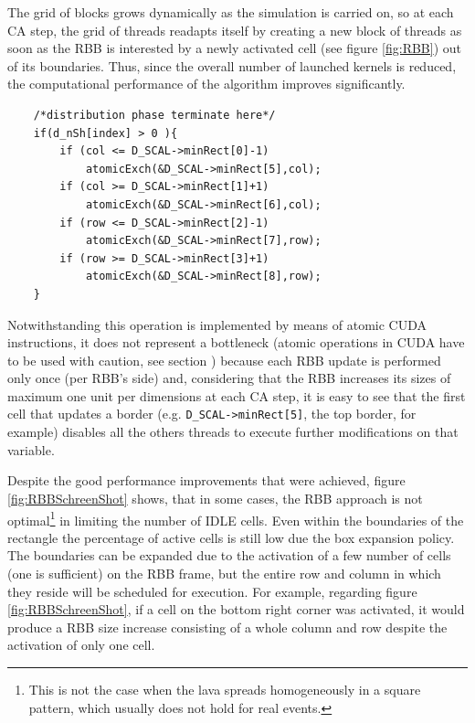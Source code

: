 The grid of blocks grows dynamically as the simulation is carried on, so at each
CA step, the grid of threads readapts itself by creating a new block of threads as
soon as the RBB is interested by a newly activated cell (see figure
\ref{fig:RBB}) out of its boundaries.
Thus, since the overall number of launched kernels is reduced,
the computational performance of the algorithm improves significantly.


\begin{lstlisting}
	/*distribution phase terminate here*/
	if(d_nSh[index] > 0 ){	
		if (col <= D_SCAL->minRect[0]-1)
			atomicExch(&D_SCAL->minRect[5],col);
		if (col >= D_SCAL->minRect[1]+1)
			atomicExch(&D_SCAL->minRect[6],col);
		if (row <= D_SCAL->minRect[2]-1)
			atomicExch(&D_SCAL->minRect[7],row);
		if (row >= D_SCAL->minRect[3]+1)
			atomicExch(&D_SCAL->minRect[8],row);
	}
\end{lstlisting}

Notwithstanding this operation is implemented by means of atomic CUDA
instructions, it does not represent a bottleneck (atomic operations in CUDA have
to be used with caution, see section \cite{NvidiaprogGuide}) because each RBB
update is performed only once (per RBB's side) and, considering that the RBB
increases its sizes of maximum one unit per dimensions at each CA step, it is
easy to see that the first cell that updates a border (e.g.
\texttt{D\_SCAL->minRect[5]}, the top border, for example) disables all the
others threads to execute further modifications on that variable.


Despite the good performance improvements that were achieved, figure
\ref{fig:RBBSchreenShot} shows, that in some cases, the RBB approach is not
optimal\footnote{This is not the case when the lava spreads
homogeneously in a square pattern, which usually does not hold for real
events.} in limiting the number of IDLE cells.
Even within the boundaries of the rectangle the percentage of active cells is
still low due the box expansion policy. The boundaries can be expanded due to
the activation of a few number of cells (one is sufficient) on the RBB frame,
but the entire row and column in which they reside will be scheduled
for execution.
For example, regarding figure \ref{fig:RBBSchreenShot}, if a cell on the bottom
right corner was activated, it would produce a RBB size increase consisting of a
whole column and row despite the activation of only one cell.



